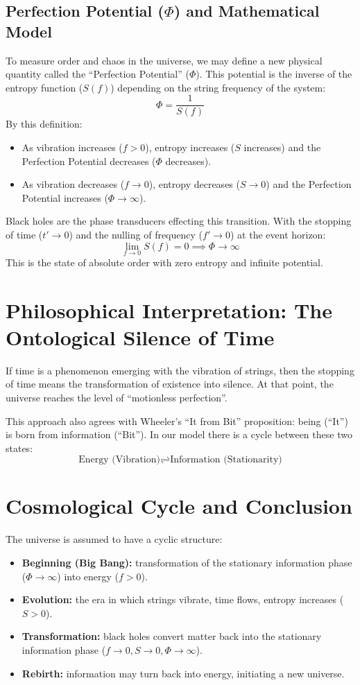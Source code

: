 \documentclass[12pt,a4paper]{article}
\begin{document}
\subsection{Perfection Potential ($\Phi$) and Mathematical Model}
To measure order and chaos in the universe, we may define a new physical quantity called the ``Perfection Potential'' ($\Phi$). This potential is the inverse of the entropy function ($S(f)$) depending on the string frequency of the system:
\begin{equation}
\Phi = \frac{1}{S(f)}
\end{equation}
By this definition:
\begin{itemize}
    \item As vibration increases ($f > 0$), entropy increases ($S$ increases) and the Perfection Potential decreases ($\Phi$ decreases).
    \item As vibration decreases ($f \to 0$), entropy decreases ($S \to 0$) and the Perfection Potential increases ($\Phi \to \infty$).
\end{itemize}
Black holes are the phase transducers effecting this transition. With the stopping of time ($t' \to 0$) and the nulling of frequency ($f' \to 0$) at the event horizon:
\begin{equation}
\lim_{f \to 0} S(f) = 0 \implies \Phi \to \infty
\end{equation}
This is the state of absolute order with zero entropy and infinite potential.

\section{Philosophical Interpretation: The Ontological Silence of Time}
If time is a phenomenon emerging with the vibration of strings,
then the stopping of time means the transformation of existence into silence.
At that point, the universe reaches the level of ``motionless perfection''.

This approach also agrees with Wheeler's ``It from Bit'' proposition:
being (``It'') is born from information (``Bit'').
In our model there is a cycle between these two states:
\[
\text{Energy (Vibration)} \rightleftharpoons \text{Information (Stationarity)}
\]

\section{Cosmological Cycle and Conclusion}
The universe is assumed to have a cyclic structure:
\begin{itemize}
\item \textbf{Beginning (Big Bang):} transformation of the stationary information phase ($\Phi \to \infty$) into energy ($f > 0$).
\item \textbf{Evolution:} the era in which strings vibrate, time flows, entropy increases ($S > 0$).
\item \textbf{Transformation:} black holes convert matter back into the stationary information phase ($f \to 0, S \to 0, \Phi \to \infty$).
\item \textbf{Rebirth:} information may turn back into energy, initiating a new universe.
\end{itemize}
\end{document}
